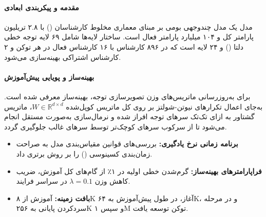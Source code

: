 \item {}

\paragraph*{مقدمه و پیکربندی ابعادی}
مدل  \cite{kimi2026k3} یک مدل چندوجهی بومی بر مبنای معماری مخلوط کارشناسان () با ۲.۸ تریلیون پارامتر کل و ۱۰۴ میلیارد پارامتر فعال است. ساختار لایه‌ها شامل ۶۹ لایه توجه خطی دلتا () و ۲۴ لایه  است که در ۸۹۶ کارشناس با ۱۶ کارشناس فعال در هر توکن و ۲ کارشناس اشتراکی بهینه‌سازی می‌شود.

\paragraph*{بهینه‌ساز  و پویایی پیش‌آموزش}
برای به‌روزرسانی ماتریس‌های وزن تصویرسازی توجه، بهینه‌ساز  معرفی شده است. به‌جای اعمال تکرارهای نیوتن-شولتز بر روی کل ماتریس کوپل‌شده $W \in \mathbb{R}^{d \times d}$، ماتریس گشتاور به ازای تک‌تک سرهای توجه افراز شده و نرمال‌سازی به‌صورت مستقل انجام می‌شود تا از سرکوب سرهای کوچک‌تر توسط سرهای غالب جلوگیری گردد.
\begin{itemize}
    \item \textbf{برنامه زمانی نرخ یادگیری:} بررسی‌های قوانین مقیاس‌بندی مدل به صراحت زمان‌بندی کسینوسی () را بر روش  برتری داد.
    \item \textbf{فراپارامترهای بهینه‌ساز:} گرم‌شدن خطی اولیه در ۱٪ از گام‌های کل آموزش، ضریب کاهش وزن $\lambda = 0.1$ در سراسر فرایند.
    \item \textbf{بافت زمینه:} آموزش از ۸K آغاز، در طول پیش‌آموزش به ۶۴K، و در مرحله سردکردن پایانی به ۲۵۶K و سپس ۱M توکن توسعه یافت.
\end{itemize}

